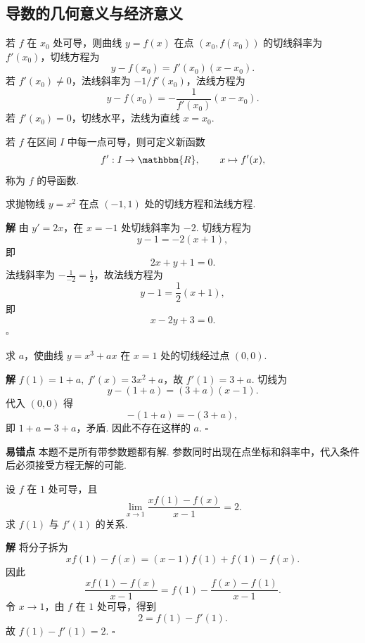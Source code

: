 \documentclass[fontset=fandol]{ctexart}
\newenvironment{solution}{\par\noindent\textbf{解}\quad}{\hfill$\square$\par\vspace{0.8em}}
\newenvironment{warning}{\par\noindent\textbf{易错点}\quad}{\par\vspace{0.8em}}
\newcommand{\RR}{\mathbbm{R}}
\begin{document}
\subsection{导数的几何意义与经济意义}

\begin{definition}[切线与法线]
若 $f$ 在 $x_0$ 处可导，则曲线 $y=f(x)$ 在点 $(x_0,f(x_0))$ 的切线斜率为 $f'(x_0)$，切线方程为
\[
y-f(x_0)=f'(x_0)(x-x_0).
\]
若 $f'(x_0)\neq0$，法线斜率为 $-1/f'(x_0)$，法线方程为
\[
y-f(x_0)=-\frac{1}{f'(x_0)}(x-x_0).
\]
若 $f'(x_0)=0$，切线水平，法线为直线 $x=x_0$.
\end{definition}

\begin{definition}[导函数]
若 $f$ 在区间 $I$ 中每一点可导，则可定义新函数
\[
f':I\to\RR,\qquad x\mapsto f'(x),
\]
称为 $f$ 的导函数.
\end{definition}

\begin{example}[切线与法线]
求抛物线 $y=x^2$ 在点 $(-1,1)$ 处的切线方程和法线方程.
\end{example}
\begin{solution}
由 $y'=2x$，在 $x=-1$ 处切线斜率为 $-2$. 切线方程为
\[
y-1=-2(x+1),
\]
即
\[
2x+y+1=0.
\]
法线斜率为 $-\frac1{-2}=\frac12$，故法线方程为
\[
y-1=\frac12(x+1),
\]
即
\[
x-2y+3=0.
\]
\end{solution}

\begin{example}[切线与参数]
求 $a$，使曲线 $y=x^3+ax$ 在 $x=1$ 处的切线经过点 $(0,0)$.
\end{example}
\begin{solution}
$f(1)=1+a,\ f'(x)=3x^2+a$，故 $f'(1)=3+a$. 切线为
\[
y-(1+a)=(3+a)(x-1).
\]
代入 $(0,0)$ 得
\[
-(1+a)=-(3+a),
\]
即 $1+a=3+a$，矛盾. 因此不存在这样的 $a$.
\end{solution}
\begin{warning}
本题不是所有带参数题都有解. 参数同时出现在点坐标和斜率中，代入条件后必须接受方程无解的可能.
\end{warning}

\begin{example}[由切线条件反求函数值]
设 $f$ 在 $1$ 处可导，且
\[
\lim_{x\to1}\frac{xf(1)-f(x)}{x-1}=2.
\]
求 $f(1)$ 与 $f'(1)$ 的关系.
\end{example}
\begin{solution}
将分子拆为
\[
xf(1)-f(x)=(x-1)f(1)+f(1)-f(x).
\]
因此
\[
\frac{xf(1)-f(x)}{x-1}
=f(1)-\frac{f(x)-f(1)}{x-1}.
\]
令 $x\to1$，由 $f$ 在 $1$ 处可导，得到
\[
2=f(1)-f'(1).
\]
故 $f(1)-f'(1)=2$.
\end{solution}
\end{document}
